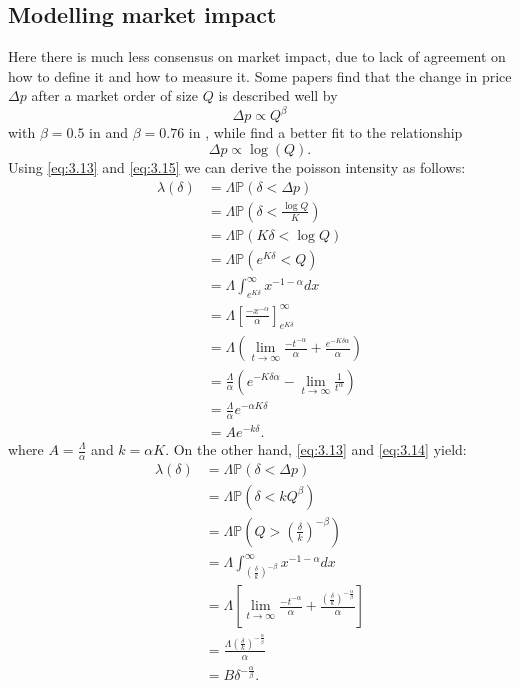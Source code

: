 \subsection*{Modelling market impact}

Here there is much less consensus on market impact, due to lack of
agreement on how to define it and how to measure it. Some papers
find that the change in price $\Delta p$ after a market order of size 
$Q$ is described well by 
\begin{equation}\label{eq:3.14}
    \Delta p\propto Q^\beta
\end{equation}
with $\beta=0.5$ in \textcite{Gabaix2006} and $\beta=0.76$ in \textcite{Weber2005},
while \textcite{Potters2003} find a better fit to the relationship
\begin{equation}\label{eq:3.15}
    \Delta p\propto\log(Q).
\end{equation}
Using \eqref{eq:3.13} and \eqref{eq:3.15} we can derive the poisson 
intensity as follows:
\begin{align*}
    \lambda(\delta)&=\Lambda\mathbb{P}(\delta<\Delta p)\\
    &=\Lambda\mathbb{P}\left(\delta<\frac{\log Q}{K}\right)\\
    &=\Lambda\mathbb{P}(K\delta<\log Q)\\
    &=\Lambda\mathbb{P}\left(e^{K\delta}<Q\right)\\
    &=\Lambda\int_{e^{K\delta}}^{\infty}x^{-1-\alpha}dx\\
    &=\Lambda\left[\frac{-x^{-\alpha}}{\alpha}\right]_{e^{K\delta}}^\infty\\
    &=\Lambda\left(\lim_{t\rightarrow\infty}\frac{-t^{-\alpha}}{\alpha}+\frac{e^{-K\delta\alpha}}{\alpha}\right)\\
    &=\frac{\Lambda}{\alpha}\left(e^{-K\delta\alpha}-\lim_{t\rightarrow\infty}\frac{1}{t^\alpha}\right)\\
    &=\frac{\Lambda}{\alpha}e^{-\alpha K\delta}\\
    &=Ae^{-k\delta}.
\end{align*}
where $A=\frac{\Lambda}{\alpha}$ and $k=\alpha K$. 
On the other hand, \eqref{eq:3.13} and \eqref{eq:3.14} yield:
\begin{align*}
    \lambda(\delta)&=\Lambda\mathbb{P}(\delta<\Delta p)\\
    &=\Lambda\mathbb{P}(\delta<kQ^\beta)\\
    &=\Lambda\mathbb{P}\left(Q>\left(\frac{\delta}{k}\right)^{-\beta}\right)\\
    &=\Lambda\int_{\left(\frac{\delta}{k}\right)^{-\beta}}^\infty x^{-1-\alpha}dx\\
    &=\Lambda\left[\lim_{t\rightarrow\infty}\frac{-t^{-\alpha}}{\alpha}+\frac{\left(\frac{\delta}{k}\right)^{-\frac{\alpha}{\beta}}}{\alpha}\right]\\
    &=\frac{\Lambda\left(\frac{\delta}{k}\right)^{-\frac{\alpha}{\beta}}}{\alpha}\\
    &=B\delta^{-\frac{\alpha}{\beta}}.
\end{align*}
